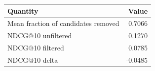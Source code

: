 \begin{tabular}{lr}
\toprule
Quantity & Value \\
\midrule
Mean fraction of candidates removed & 0.7066 \\
NDCG@10 unfiltered & 0.1270 \\
NDCG@10 filtered & 0.0785 \\
NDCG@10 delta & -0.0485 \\
\bottomrule
\end{tabular}
